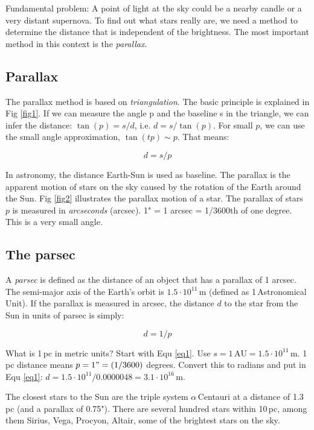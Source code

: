 Fundamental problem: A point of light at the sky could be a nearby candle or a very distant supernova. To find out what stars really are, we need a method to determine the distance that is independent of the brightness. The most important method in this context is the \textit{parallax}.

\subsection{Parallax}

The parallax method is based on \textit{triangulation}. The basic principle is explained in Fig \ref{fig1}. If we can measure the angle p and the baseline s in the triangle, we can infer the distance: $\tan{(p)} = s/d$, i.e. $d = s/\tan{(p)}$. For small $p$, we can use the small angle approximation, $\tan{(tp)} \sim p$. That means:

\begin{equation}
d = s/p
\label{eq1}
\end{equation}

In astronomy, the distance Earth-Sun is used as baseline. The parallax is the apparent motion of stars on the sky caused by the rotation of the Earth around the Sun. Fig \ref{fig2} illustrates the parallax motion of a star. The parallax of stars $p$ is measured in \textit{arcseconds} (arcsec). 1" = 1 arcsec = 1/3600th of one degree. This is a very small angle.

\subsection{The parsec}

A \textit{parsec} is defined as the distance of an object that has a parallax of 1 arcsec. The semi-major axis of the Earth's orbit is $1.5 \cdot 10^{11}$\,m (defined as 1\,Astronomical Unit). If the parallax is measured in arcsec, the distance $d$ to the star from the Sun in units of parsec is simply:

\begin{equation}
d = 1/p
\label{eq2}
\end{equation}

What is 1\,pc in metric units? Start with Equ \eqref{eq1}. Use $s = 1\,\mathrm{AU} = 1.5 \cdot 10^{11}$\,m. 1\,pc distance means $p = 1" = (1/3600)$ degrees. Convert this to radians and put in Equ \eqref{eq1}: $d = 1.5 \cdot 10^{11} / 0.0000048 = 3.1 \cdot 10^{16}$\,m. 

The closest stars to the Sun are the triple system $\alpha$\,Centauri at a distance of 1.3\,pc (and a parallax of 0.75"). There are several hundred stars within 10\,pc, among them Sirius, Vega, Procyon, Altair, some of the brightest stars on the sky.


